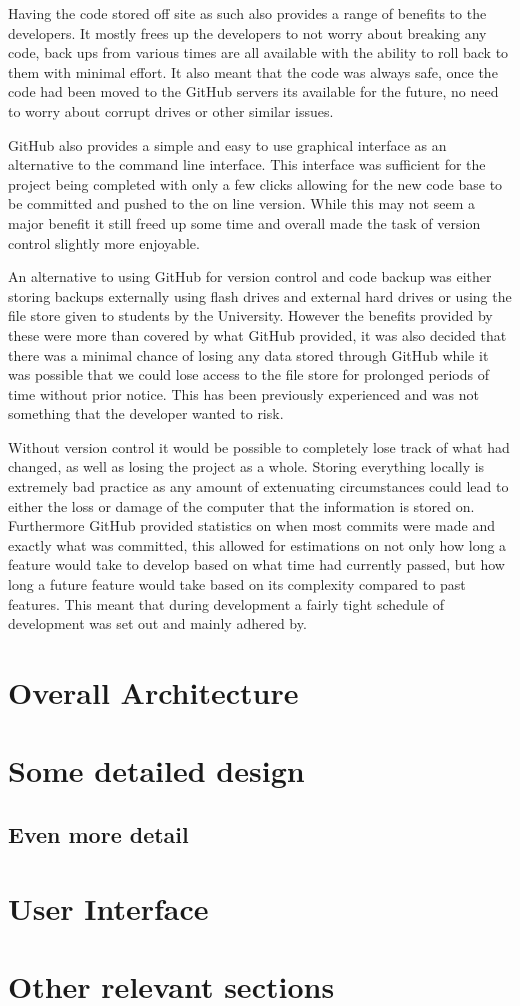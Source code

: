 Having the code stored off site as such also provides a range of benefits to the developers. It mostly frees up the developers to not worry about breaking any code, back ups from various times are all available with the ability to roll back to them with minimal effort. It also meant that the code was always safe, once the code had been moved to the GitHub servers its available for the future, no need to worry about corrupt drives or other similar issues. 

GitHub also provides a simple and easy to use graphical interface as an alternative to the command line interface. This interface was sufficient for the project being completed with only a few clicks allowing for the new code base to be committed and pushed to the on line version. While this may not seem a major benefit it still freed up some time and overall made the task of version control slightly more enjoyable. 

An alternative to using GitHub for version control and code backup was either storing backups externally using flash drives and external hard drives or using the file store given to students by the University. However the benefits provided by these were more than covered by what GitHub provided, it was also decided that there was a minimal chance of losing any data stored through GitHub while it was possible that we could lose access to the file store for prolonged periods of time without prior notice. This has been previously experienced and was not something that the developer wanted to risk.

Without version control it would be possible to completely lose track of what had changed, as well as losing the project as a whole. Storing everything locally is extremely bad practice as any amount of extenuating circumstances could lead to either the loss or damage of the computer that the information is stored on. Furthermore GitHub provided statistics on when most commits were made and exactly what was committed, this allowed for estimations on not only how long a feature would take to develop based on what time had currently passed, but how long a future feature would take based on its complexity compared to past features. This meant that during development a fairly tight schedule of development was set out and mainly adhered by.
\section{Overall Architecture}

\section{Some detailed design}

\subsection{Even more detail}

\section{User Interface}

\section{Other relevant sections}